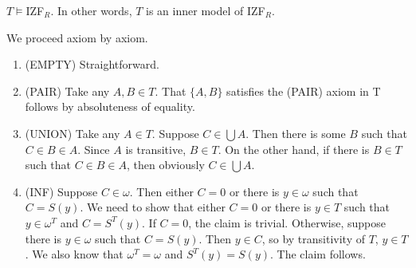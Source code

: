 \documentclass{LMCS}
\newcommand{\izfr}{IZF${}_R$}
\begin{document}
\begin{thm}\label{tlsmodel}
$T \models$\izfr. In other words, $T$ is an inner model of \izfr. 
\end{thm}
\proof We proceed axiom by axiom. 
\begin{enumerate}[$\bullet$]
\item (EMPTY) Straightforward. 
\item (PAIR) Take any $A, B \in T$. That $\{ A, B \}$ satisfies the (PAIR) axiom in T 
follows by absoluteness of equality.
\item (UNION) Take any $A \in T$. Suppose $C \in \bigcup A$. Then there is
some $B$ such that $C \in B \in A$. Since $A$ is transitive, $B \in T$. On the
other hand, if there is $B \in T$ such that $C \in B \in A$, then obviously $C \in \bigcup A$. 
\item (INF) Suppose $C \in \omega$. Then either $C = 0$ or there is $y \in
\omega$ such that $C = S(y)$. We need to show that either $C = 0$ or there
is $y \in T$ such that $y \in \omega^T$ and $C = S^T(y)$. If $C = 0$, the claim
is trivial. Otherwise, suppose there is $y \in \omega$ such that $C = S(y)$.
Then $y \in C$, so by transitivity of $T$, $y \in T$. 
We also know that $\omega^T = \omega$ and $S^T(y) = S(y)$. The claim follows. 


\end{enumerate}
\end{document}
